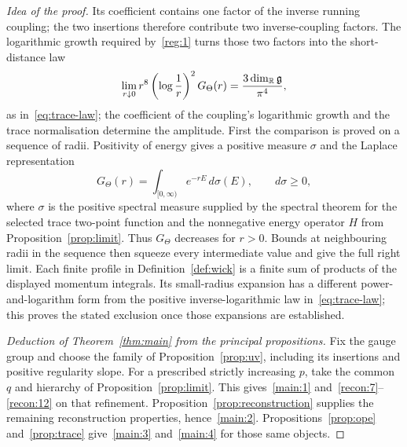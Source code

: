 \emph{Idea of the proof.}
Its coefficient contains one factor of the inverse running coupling; the two insertions therefore contribute two inverse-coupling factors.
The logarithmic growth required by~\ref{reg:1} turns those two factors into the short-distance law
\begin{equation*}
 \lim_{r\downarrow0}r^8\left(\log\frac1r\right)^2G_\Theta(r)
 =\frac{3\dim_\mathbb R\mathfrak g}{\pi^4},
\end{equation*}
as in~\eqref{eq:trace-law}; the coefficient of the coupling's logarithmic growth and the trace normalisation determine the amplitude.
First the comparison is proved on a sequence of radii. Positivity of energy gives a positive measure $\sigma$ and the Laplace representation
\begin{equation*}
 G_\Theta(r)=\int_{[0,\infty)}e^{-rE}\,d\sigma(E),\qquad d\sigma\ge0,
\end{equation*}
where $\sigma$ is the positive spectral measure supplied by the spectral theorem for the selected trace two-point function and the nonnegative energy operator $H$ from Proposition~\ref{prop:limit}. Thus $G_\Theta$ decreases for $r>0$. Bounds at neighbouring radii in the sequence then squeeze every intermediate value and give the full right limit.
Each finite profile in Definition~\ref{def:wick} is a finite sum of products of the displayed momentum integrals. Its small-radius expansion has a different power-and-logarithm form from the positive inverse-logarithmic law in~\eqref{eq:trace-law}; this proves the stated exclusion once those expansions are established.


\begin{proof}[Deduction of Theorem~\ref{thm:main} from the principal propositions]
Fix the gauge group and choose the family of Proposition~\ref{prop:uv}, including its insertions and positive regularity slope.
For a prescribed strictly increasing $p$, take the common $q$ and hierarchy of Proposition~\ref{prop:limit}.
This gives~\ref{main:1} and~\ref{recon:7}--\ref{recon:12} on that refinement.
Proposition~\ref{prop:reconstruction} supplies the remaining reconstruction properties, hence~\ref{main:2}.
Propositions~\ref{prop:ope} and~\ref{prop:trace} give~\ref{main:3} and~\ref{main:4} for those same objects.
\end{proof}

